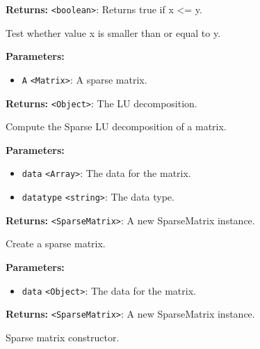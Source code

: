 \documentclass[12pt,a4paper]{article}
\begin{document}
\noindent \textbf{Returns:} \texttt{<boolean>}: Returns true if x <= y.

\noindent Test whether value x is smaller than or equal to y.

\vspace{5mm}
\noindent {}


\noindent \textbf{Parameters:}
\begin{itemize}
  \item \texttt{A} \texttt{<Matrix>}: A sparse matrix.
\end{itemize}

\noindent \textbf{Returns:} \texttt{<Object>}: The LU decomposition.

\noindent Compute the Sparse LU decomposition of a matrix.

\vspace{5mm}
\noindent {}


\noindent \textbf{Parameters:}
\begin{itemize}
  \item \texttt{data} \texttt{<Array>}: The data for the matrix.
  \item \texttt{datatype} \texttt{<string>}: The data type.
\end{itemize}

\noindent \textbf{Returns:} \texttt{<SparseMatrix>}: A new SparseMatrix instance.

\noindent Create a sparse matrix.

\vspace{5mm}
\noindent {}


\noindent \textbf{Parameters:}
\begin{itemize}
  \item \texttt{data} \texttt{<Object>}: The data for the matrix.
\end{itemize}

\noindent \textbf{Returns:} \texttt{<SparseMatrix>}: A new SparseMatrix instance.

\noindent Sparse matrix constructor.

\vspace{5mm}
\noindent {}\vspace{4mm}
\end{document}
